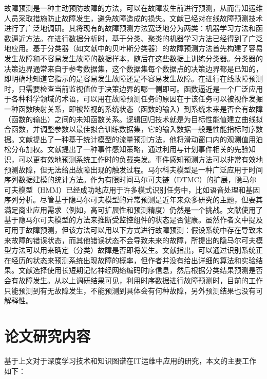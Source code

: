 故障预测是一种主动预防故障的方法，可以在故障发生前进行预测，从而告知运维人员采取措施防止故障发生，避免故障造成的损失。文献\parencite{salfner2010survey}已经对在线故障预测技术进行了广泛地调研。其将现有的故障预测方法宽泛地分为两类：机器学习方法和函数逼近方法。在进行数据分析时，基于分类、聚类的机器学习方法已经得到了广泛地应用。基于分类器（如文献\parencite{tan2012prepare}中的贝叶斯分类器）的故障预测方法首先构建了容易发生故障和不容易发生故障的数据样本，随后在这些数据上训练分类器。分类器的决策边界通常来自于参考数据集，这个数据集每个数据点的决策边界都是已知的，即明确地知道它指示的是容易发生故障还是不容易发生故障。在进行在线故障预测时，只需要检查当前监视值位于决策边界的哪一侧即可。函数逼近是一个广泛应用于各种科学领域的术语，可以用在故障预测任务的原因在于该任务可以被视作发掘一种函数映射关系，即被监视的系统状态（函数的输入）到系统未来是否会有故障（函数的输出）之间的未知函数关系。逻辑回归技术就是为目标性能值建立曲线拟合函数，并调整参数以最佳拟合训练数据集\parencite{salfner2010survey}，它的输入数据一般是性能指标时序数据。文献\parencite{dalmazo2013predicting}提出了一种基于统计模型的流量预测方法，他将滑动窗口内的观测值用泊松分布加权。文献\parencite{sladescu2012event}提出了一种事件感知策略，通过利用与计划事件相关的先验知识，可以更有效地预测系统工作时的负载突发。事件感知预测方法可以非常有效地预测故障，但无法给出故障出现的触发过程。马尔科夫模型是一种广泛应用于时间序列数据建模的统计方法。作为有限时间马尔可夫链（DTMC）的扩展，隐马尔可夫模型（HMM）已经成功地应用于许多模式识别任务中，比如语音处理和基因序列分析。尽管基于隐马尔可夫模型的异常预测是近年来众多研究的主题，但要其满足商业应用需求（例如，高可扩展性和预测精度）仍然是一个挑战。文献\parencite{purushotham2005multi}使用了基于隐马尔可夫模型的方法来推断受监控组件的状态是否健康。虽然作者文中提及可用于故障预测，但该方法可以用以下方式进行故障预测：假设系统中存在导致未来故障的错误状态，而其他错误状态不会导致未来的故障，所提出的隐马尔可夫模型方法可以用来确定（分类）故障是否即将发生。文献\parencite{boutros2011detection}指出，可以通过识别系统正在经历的状态来预测系统出现故障的概率，但作者并没有给出详细的算法和实验结果。文献\parencite{li2020predicting,gao2020task}选择使用长短期记忆神经网络编码时序信息，然后根据分类结果预测是否会有故障发生。从以上调研结果可见，利用时序数据进行故障预测时，目前的工作只能预测到有无故障发生，不能预测到具体会有何种故障，另外预测结果也没有可解释性。

\section{论文研究内容}
基于上文对于深度学习技术和知识图谱在IT运维中应用的研究，本文的主要工作如下：

